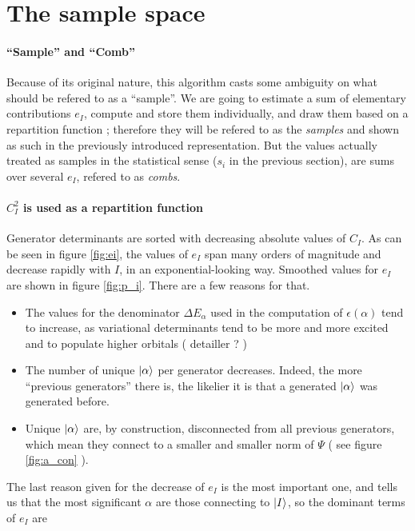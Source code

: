 \documentclass[./thesis.tex]{subfiles}
\begin{document}
\section{The sample space}

\paragraph{``Sample'' and ``Comb''}
Because of its original nature, this algorithm casts some ambiguity on what should be refered to as a ``sample''. We are going to estimate a sum of elementary contributions $e_I$, compute and store them individually, and draw them based on a repartition function ; therefore they will be refered to as the \emph{samples} and shown as such in the previously introduced representation. But the values actually treated as samples in the statistical sense ($s_i$ in the previous section), are sums over several $e_I$, refered to as \emph{combs}.


\paragraph{$C_I^2$ is used as a repartition function}
Generator determinants are sorted with decreasing absolute values of $C_I$.
	As can be seen in figure \ref{fig:ei}, the values of $e_I$ span many orders of magnitude and decrease rapidly with $I$, in an exponential-looking way. Smoothed values for $e_I$ are shown in figure \ref{fig:p_i}. There are a few reasons for that.
\begin{itemize}
	\item
	The values for the denominator $\Delta E_\alpha$ used in the computation of $\epsilon(\alpha)$ tend to increase, as variational determinants tend to be more and more excited and to populate higher orbitals ( detailler ? )
	\item
	The number of unique $\ket \alpha$ per generator decreases. Indeed, the more ``previous generators'' there is, the likelier it is that a generated $\ket \alpha$ was generated before.
	\item
	Unique $\ket \alpha$ are, by construction, disconnected from all previous generators, which mean they connect to a smaller and smaller norm of $\Psi$ ( see figure \ref{fig:a_con} ). 
\end{itemize}


The last reason given for the decrease of $e_I$ is the most important one, and tells us that the most significant $\alpha$ are those connecting to ${\ket{I}}$, so the dominant terms of $e_I$ are 
\end{document}
